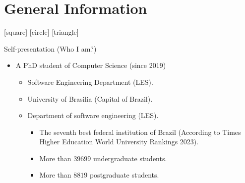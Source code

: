 \documentclass[newPxFont,numfooter,sectionpages]{beamer}
\begin{document}
\section{General Information}


{
%
[square]
[circle]
[triangle]
\begin{frame}[c]{Self-presentation (Who I am?)}

\begin{mybox}
\begin{itemize}
	\item {\color{white} A PhD student of Computer Science (since 2019)}
	\begin{itemize}
		\item {\color{white} Software Engineering Department (LES).}
            \item {\color{white} University of Brasilia (Capital of Brazil).}
            \item {\color{white} Department of software engineering (LES).}
            \begin{itemize}
		      \item {\color{white} The seventh best federal institution of Brazil (According to Times Higher Education World University Rankings 2023).}
                \item {\color{white} More than $39699$ undergraduate students.}
                \item {\color{white} More than $8819$ postgraduate students.}
	    \end{itemize}
	\end{itemize}
\end{itemize}
\end{mybox}

\end{frame}
}
\end{document}
